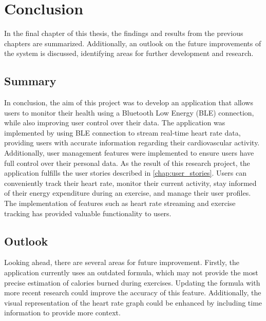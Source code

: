 \chapter{Conclusion}
In the final chapter of this thesis, the findings and results from the previous chapters are summarized. 
Additionally, an outlook on the future improvements of the system is discussed, identifying areas for further development and research. 

\section{Summary}
In conclusion, the aim of this project was to develop an application that allows users to monitor their health using a Bluetooth Low Energy (BLE) connection, while also improving user control over their data. 
The application was implemented by using BLE connection to stream real-time heart rate data, providing users with accurate information regarding their cardiovascular activity. 
Additionally, user management features were implemented to ensure users have full control over their personal data.
As the result of this research project, the application fulfills the user stories described in \autoref{chap:user_stories}.
Users can conveniently track their heart rate, monitor their current activity, stay informed of their energy expenditure during an exercise, and manage their user profiles. 
The implementation of features such as heart rate streaming and exercise tracking has provided valuable functionality to users.

\section{Outlook}
Looking ahead, there are several areas for future improvement. 
Firstly, the application currently uses an outdated formula, which may not provide the most precise estimation of calories burned during exercises. 
Updating the formula with more recent research could improve the accuracy of this feature.
Additionally, the visual representation of the heart rate graph could be enhanced by including time information to provide more context.